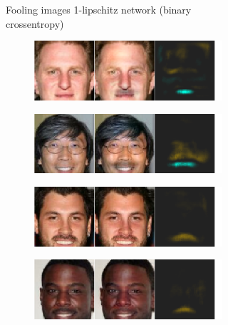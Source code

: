 \documentclass{article}
\begin{document}
\begin{figure}
\begin{subfigure}{1.\textwidth}
\begin{subfigure}{.245\textwidth}
      \label{fig:remove_mustache_6850_Classic}
    \end{subfigure}  
    \caption{Fooling images 1-lipschitz network (binary crossentropy)}
\end{subfigure}  
\begin{subfigure}{1.\textwidth}
    \begin{subfigure}{.245\textwidth}
      \centering
      \includegraphics[width=1\linewidth]{img/fooling/AddingMoustache_52_HKR.png}
      \label{fig:AddingMoustache_1_OK}
    \end{subfigure}%
    \begin{subfigure}{.245\textwidth}
      \centering
      \includegraphics[width=1\linewidth]{img/fooling/AddingMoustache_54_HKR.png}
      \label{fig:AddingMoustache_5_OK}
    \end{subfigure}
    \begin{subfigure}{.245\textwidth}
      \centering
      \includegraphics[width=1\linewidth]{img/fooling/remove_mustache_1489_hKR.png}
      \label{fig:AddingMoustache_3_OK}
    \end{subfigure}%
    \begin{subfigure}{.245\textwidth}
      \centering
      \includegraphics[width=1\linewidth]{img/fooling/remove_mustache_6850_hKR.png}

\end{subfigure}
\end{subfigure}
\end{figure}
\end{document}
